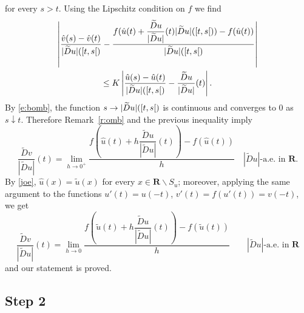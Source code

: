 \documentclass[draft]{amsart}
\theoremstyle{definition}
\theoremstyle{remark}
\newcommand{\interval}[1]{\mathinner{#1}}
\begin{document}
for every $s>t$. Using the Lipschitz condition on $f$ we find
{\setlength{\multlinegap}{0pt}
\begin{multline*}
\left|\frac{\hat v(s)-\hat
v(t)}{|\widetilde{D}u|(\interval{\left[t,s\right[})} -\frac{f(\hat
u(t)+\dfrac{\widetilde{D}u}{|\widetilde{D}u|}(t)
|\widetilde{D}u|(\interval{\left[t,s\right[}))-f(\hat
u(t))}{|\widetilde{D}u|(\interval{\left[t,s\right[})}\right|\\
\le K\left|
\frac{\hat u(s)-\hat u(t)}{|\widetilde{D}u|(\interval{\left[t,s\right[})}
-\frac{\widetilde{D}u}{|
\widetilde{D}u|}(t)\right|.\end{multline*}
}%
By \eqref{e:bomb}, the function $s\to
|\widetilde{D}u|(\interval{\left[t,s\right[})$ is continuous and
converges to 0 as $s\downarrow t$. Therefore Remark~\ref{r:omb} and the
previous inequality imply
\[\frac{\widetilde{D}v}{|\widetilde{D}u|}(t)=\lim_{h\to 0^+}
\frac{f(\hat u(t)+h\dfrac{\widetilde{D}u}{|\widetilde{D}u|}
(t))-f(\hat u(t))}h\quad|\widetilde{D}u|\text{-a.e. in }\mathbf{R}.\]
By \eqref{joe}, $\hat u(x)=\tilde u(x)$ for every $x\in\mathbf{R}\backslash S_u$;
moreover, applying the same argument to the functions $u'(t)=u(-t)$,
$v'(t)=f(u'(t))=v(-t)$, we get
\[\frac{\widetilde{D}v}{|\widetilde{D}u|}(t)=\lim_{h\to 0}
\frac{f(\tilde u(t)+h\dfrac{\widetilde{D}u}{|\widetilde{D}u|}(t))-f(\tilde
u(t))}{h}\qquad|\widetilde{D}u|\text{-a.e. in }\mathbf{R}\]
and our statement is proved.

\subsection*{Step 2}
\end{document}
